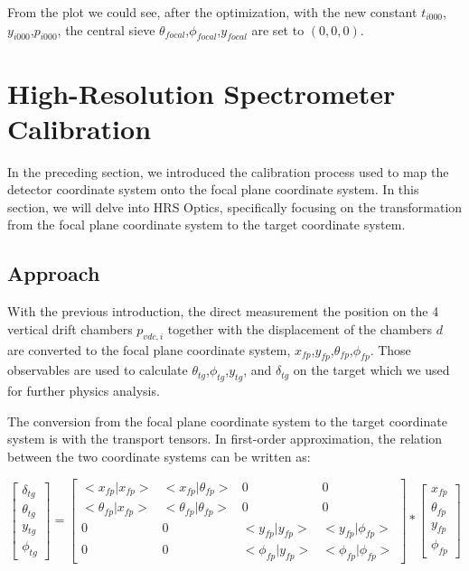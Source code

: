 From the plot we could see, after the optimization, with the new constant $t_{i000}$,$y_{i000}$,$p_{i000}$, the central sieve $\theta_{focal}$,$\phi_{focal}$,$y_{focal}$ are set to $(0,0,0)$.


\section{High-Resolution Spectrometer Calibration}

In the preceding section, we introduced the calibration process used to map the detector coordinate system onto the focal plane coordinate system. In this section, we will delve into HRS Optics, specifically focusing on the transformation from the focal plane coordinate system to the target coordinate system.

\subsection{Approach}

With the previous introduction, the direct measurement the position on the 4 vertical drift chambers $p_{vdc,i}$ together with the displacement of the chambers $d$ are converted to the focal plane coordinate system, $x_{fp}$,$y_{fp}$,$\theta_{fp}$,$\phi_{fp}$. Those observables are used to calculate $\theta_{tg}$,$\phi_{tg}$,$y_{tg}$, and $\delta_{tg}$ on the target which we used for further physics analysis. 

The conversion from the focal plane coordinate system to the target coordinate system is with the transport tensors. In first-order approximation, the relation between the two coordinate systems can be written as:

\begin{equation}
\begin{bmatrix}
\delta_{tg} \\
\theta_{tg} \\
y_{tg} \\
\phi_{tg}
\end{bmatrix} = \begin{bmatrix}
    <x_{fp}|x_{fp}> & <x_{fp}|\theta_{fp}> & 0 & 0 \\
    <\theta_{fp}|x_{fp}> & <\theta_{fp}|\theta_{fp}> & 0 & 0 \\
    0 & 0 & <y_{fp}|y_{fp}> & <y_{fp}|\phi_{fp}>  \\
    0 & 0 & <\phi_{fp}|y_{fp}> & <\phi_{fp}|\phi_{fp}>  
\end{bmatrix} * \begin{bmatrix}
    x_{fp} \\
    \theta_{fp} \\
    y_{fp} \\
    \phi_{fp}
\end{bmatrix}
\end{equation}

